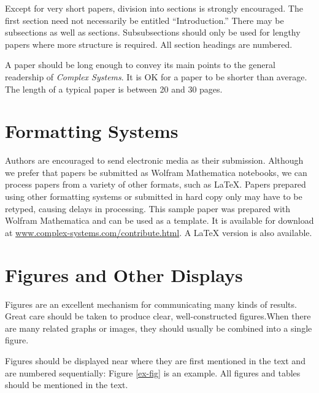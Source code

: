 \documentclass{article}
\begin{document}
Except for very short papers, division into sections is strongly encouraged. The first section need not necessarily be entitled {``}Introduction.{''}
%
There may be subsections as well as sections. Subsubsections should only be used for lengthy papers where more structure is required. All section
headings are numbered. 

A paper should be long enough to convey its main points to the general readership of \textit{Complex Systems}. It is OK for a paper to be shorter
than average. The length of a typical paper is between 20 and 30 pages.

\section{Formatting Systems}

Authors are encouraged to send electronic media as their submission. Although we prefer that papers be submitted as Wolfram Mathematica notebooks, we can process papers from a variety of other formats, such as LaTeX. Papers prepared using other formatting systems or submitted in hard copy only may have to be retyped, causing delays in processing. This sample paper was prepared with Wolfram Mathematica and can be used as a template. It is available for download at \url{www.complex-systems.com/contribute.html}. A LaTeX version is also available.

\section{Figures and Other Displays}

Figures are an excellent mechanism for communicating many kinds of results. Great care should be taken to produce clear, well-constructed figures.When there are many related graphs or images, they should usually be combined into a single figure. 

Figures should be displayed near where they are first mentioned in the text and are numbered sequentially: Figure \ref{ex-fig} is an example. All figures and tables should be mentioned in the text.
\end{document}
